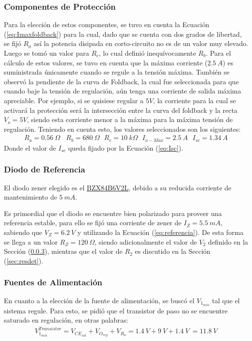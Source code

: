 \subsubsection{Componentes de Protección}
Para la elección de estos componentes, se tuvo en cuenta la Ecuación (\ref{eq:Imaxfoldback}) para la cual, dado que se cuenta con dos grados de libertad, se fijó $R_a$ así la potencia disipada en corto-circuito no es de un valor muy elevado. Luego se tomó un valor para $R_c$, lo cual definió inequívocamente $R_b$. Para el cálculo de estos valores, se tuvo en cuenta que la máxima corriente ($2.5 \ A$) es suministrada únicamente cuando se regule a la tensión máxima. También se observó la pendiente de la curva de Foldback, la cual fue seleccionada para que cuando baje la tensión de regulación, aún tenga una corriente de salida máxima apreciable. Por ejemplo, si se quisiese regular a $5V$, la corriente para la cual se activará la protección será la intersección entre la curva del foldback y la recta $V_o = 5V$, siendo esta corriente menor a la máxima para la máxima tensión de regulación. Teniendo en cuenta esto, los valores seleccionados son los siguientes:
\begin{align}
R_a=0.56 \ \Omega  \ \ \ \ R_b=680 \ \Omega \ \ \ R_c=10 \ k\Omega \ \ \ I_{o-Max}=2.5 \ A \ \ \ I_{sc}= 1.34 \ A
\end{align}
Donde el valor de $I_{sc}$ queda fijado por la Ecuación (\ref{eq:Isc}).

\subsubsection{Diodo de Referencia}
El diodo zener elegido es el \href{https://d1d2qsbl8m0m72.cloudfront.net/en/products/databook/datasheet/discrete/diode/zener/bzx84b6v2lt116-e.pdf}{BZX84B6V2L},
debido a su reducida corriente de mantenimiento de $5 \ mA$.

Es primordial que el diodo se encuentre bien polarizado para proveer una referencia estable, para ello se fijó una corriente de zener de $I_Z =5.5 \ mA$, sabiendo que $V_Z=6.2 \ V$ y utilizando la Ecuación (\ref{eq:referencia}). De esta forma se llega a un valor $R_Z=120 \ \Omega$, siendo adicionalmente el valor de $V_2$ definido en la Sección (\ref{sec:fuentes}), mientras que el valor de $R_2$ es discutido en la Sección (\ref{sec:resdet}).

\subsubsection{Fuentes de Alimentación}
\label{sec:fuentes}
En cuanto a la elección de la fuente de alimentación, se buscó el $V_{1_{min}}$ tal que el sistema regule. Para esto, se pidió que el transistor de paso no se encuentre saturado en regulación, en otras palabras:
\begin{align}
V_{1_{min}}^{Transistor}=V_{CE_{sat}}+V_{O_{reg}}+V_{R_a}= 1.4 \ V+9 \ V +1.4 \ V \ =11.8 \ V
\end{align}

